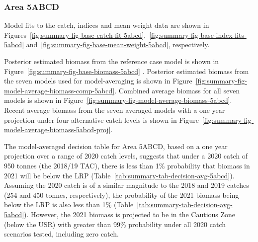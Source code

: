 \documentclass[11pt]{book}
\begin{document}
\hypertarget{area-5abcd}{%
\subsubsection{Area 5ABCD}\label{area-5abcd}}

Model fits to the catch, indices and mean weight data are shown in Figures~\ref{fig:summary-fig-base-catch-fit-5abcd},~\ref{fig:summary-fig-base-index-fits-5abcd} and~\ref{fig:summary-fig-base-mean-weight-5abcd}, respectively.

Posterior estimated biomass from the reference case model is shown in Figure~\ref{fig:summary-fig-base-biomass-5abcd} . Posterior estimated biomass from the seven models used for model-averaging is shown in Figure~\ref{fig:summary-fig-model-average-biomass-comp-5abcd}. Combined average biomass for all seven models is shown in Figure~\ref{fig:summary-fig-model-average-biomass-5abcd}. Recent average biomass from the seven averaged models with a one year projection under four alternative catch levels is shown in Figure~\ref{fig:summary-fig-model-average-biomass-5abcd-proj}.

The model-averaged decision table for Area 5ABCD, based on a one year projection over a range of 2020 catch levels, suggests that under a 2020 catch of 950 tonnes (the 2018/19 TAC), there is less than 1\% probability that biomass in 2021 will be below the LRP (Table~\ref{tab:summary-tab-decision-avg-5abcd}). Assuming the 2020 catch is of a similar magnitude to the 2018 and 2019 catches (254 and 450 tonnes, respectively), the probability of the 2021 biomass being below the LRP is also less than 1\% (Table~\ref{tab:summary-tab-decision-avg-5abcd}). However, the 2021 biomass is projected to be in the Cautious Zone (below the USR) with greater than 99\% probability under all 2020 catch scenarios tested, including zero catch.
\end{document}
